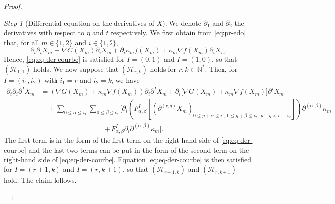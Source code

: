 \documentclass{article}
\newcommand{\DI}{\partial^I}
\newcommand{\EN}{\mathbb{N}}
\newcommand{\ko}{\kappa}
\renewcommand{\H}{\mathcal{H}}
\theoremstyle{remark}
\theoremstyle{prpart}
\newtheorem{proofpart}{Step}
\renewcommand{\H}{\mathcal{H}}
\begin{document}
\begin{proof}
\begin{proofpart}[Differential equation on the derivatives of $X$]
We denote $\partial_1$ and $\partial_2$ the derivatives with respect to $\eta$ and $t$ respectively. We first obtain from \eqref{eq:pr-edo} that,
 for all $m\in\{1,2\}$ and $i\in\{1,2\}$, 
\begin{equation*}
 \partial_t \partial_i X_m = \nabla G(X_m)\partial_i X_m 
 + \partial_i \ko_m f(X_m) + \ko_m\nabla f(X_m) \partial_i X_m.
\end{equation*}
Hence, \eqref{eq:eq-der-courbe} is satisfied for $I=(0,1)$ and $I=(1,0)$, so that $(\H_{1,1})$ holds. We now suppose that $(\H_{r,k})$ holds for $r,k\in\EN^\ast$. Then, for $I=(i_1,i_2)$ with $i_1=r$ and $i_2=k$, we have 
\begin{align*}
\partial_t\partial_i\DI X_m &= (\nabla G(X_m)+\ko_m\nabla f(X_m))\partial_i\DI X_m + \partial_i\big[\nabla G(X_m)+\ko_m\nabla f(X_m)\big]\DI X_m \\
&\quad+ \sum_{0\leq\alpha\leq i_1}\sum_{0\leq\beta\leq i_2}\bigg[\partial_i \left(F^I_{\alpha,\beta}\left[(\partial^{(p,q)}X_m)_{0\leq p+\alpha \leq i_1,~0\leq q+\beta\leq i_2, ~p+q<i_1+i_2}\right]\right) \partial^{(\alpha,\beta)}\ko_m \\
  &\qquad\qquad\qquad\qquad\quad+ F^I_{\alpha,\beta} \partial_i\partial^{(\alpha,\beta)}\ko_m\bigg].
\end{align*}
The first term is in the form of the first term on the right-hand side of \eqref{eq:eq-der-courbe} and the last two terms can be put in the form of the second term on the right-hand side of \eqref{eq:eq-der-courbe}. Equation \eqref{eq:eq-der-courbe} is then satisfied for $I=(r+1,k)$ and $I=(r,k+1)$, so that $(\H_{r+1,k})$ and $(\H_{r,k+1})$ hold. The claim follows.
\end{proofpart}


\end{proof}
\end{document}
